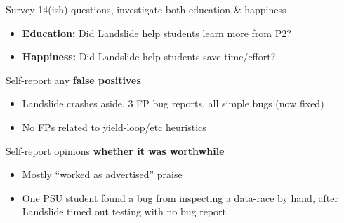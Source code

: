 \documentclass[xcolor=dvipsnames]{beamer}
\begin{document}
%
%

\begin{frame}{Survey}
	14(ish) questions, investigate both education \& happiness
	\begin{itemize}
		\item {\bf Education:} Did Landslide help students learn more from P2?
		\item {\bf Happiness:} Did Landslide help students save time/effort?
	\end{itemize}
	\pause
	\linegap

	Self-report any {\bf false positives}
	\begin{itemize}
		\item Landslide crashes aside, 3 FP bug reports, all simple bugs (now fixed)
		\item No FPs related to yield-loop/etc heuristics
	\end{itemize}
	\linegap

	Self-report opinions {\bf whether it was worthwhile}
	\begin{itemize}
		\item Mostly ``worked as advertised'' praise
		\item One PSU student found a bug from inspecting a data-race by hand,
			after Landslide timed out testing with no bug report
	\end{itemize}
\end{frame}
\end{document}
